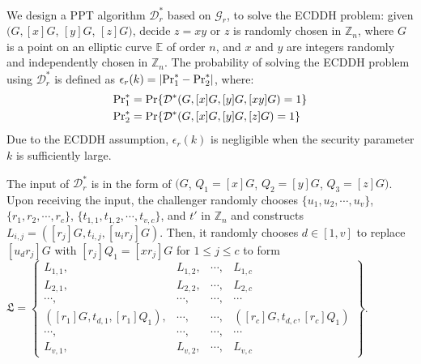 {{{{We design a PPT algorithm $\mathcal{D}^*_r$ based on $\mathcal{G}_r$, %
 to solve the ECDDH problem:
 given $(G, [x]G$, $[y]G$, $[z]G)$, decide $z = xy$ or $z$ is randomly chosen in $\mathbb{Z}_n$,
    where $G$ is a point on an elliptic curve $\mathbb{E}$ of order $n$, and $x$ and $y$ are integers randomly and independently chosen in $\mathbb{Z}_n$.
The probability of solving the ECDDH problem using $\mathcal{D}^*_r$ is defined as $\epsilon_{r}(k) = |{\rm Pr}^*_1 - {\rm Pr}^*_2|$, where:
\begin{align*}
&{\rm Pr}^*_1 =  {\rm Pr}\{\mathcal{D}^*(G, [x]G, [y]G, [xy]G)=1\} \\
&{\rm Pr}^*_2 =  {\rm Pr}\{\mathcal{D}^*(G, [x]G, [y]G, [z]G)=1\}
\end{align*}
Due to the ECDDH assumption,
    $\epsilon_{r}(k)$ is negligible when the security parameter $k$ is sufficiently large.

%


The input of $\mathcal{D}^*_r$ is in the form of $(G$, $Q_1=[x]G$, $Q_2=[y]G$, $Q_3=[z]G)$. Upon receiving the input, the challenger randomly chooses $\{u_1, u_2, \cdots, u_v\}$, $\{r_1, r_2, \cdots, r_c\}$, $\{t_{1, 1}, t_{1, 2}, \cdots, t_{v, c}\}$, and $t'$ in $\mathbb{Z}_n$ and constructs $L_{i, j} = ([r_j]G, t_{i, j}, [u_ir_j]G)$. Then, it randomly chooses $d \in [1, v]$ to replace $[u_d r_j]G$ with $[r_j]Q_1=[xr_j]G$ for $1\leq j \leq c$ to form $\mathfrak{L}=\left \{ \begin{matrix}
L_{1,1},&L_{1,2},&\cdots,&L_{1,c}\\
L_{2,1},& L_{2,2},&\cdots,&L_{2,c}\\
\cdots,&\cdots,&\cdots,&\cdots\\
([r_{1}]G, t_{d, 1}, [r_{1}]Q_1),&\cdots,&\cdots,&([r_{c}]G, t_{d, c}, [r_{c}]Q_1)\\
\cdots,&\cdots,&\cdots,&\cdots\\
L_{v,1},&L_{v,2},&\cdots,&L_{v,c}
\end{matrix}\right\}$.

}}}}
